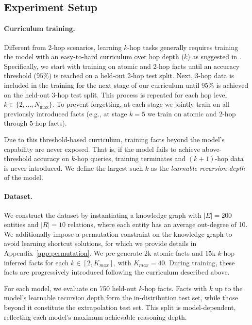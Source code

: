 \documentclass{article} %
\begin{document}
\subsection{Experiment Setup}
\label{sec:exp_setup}

\paragraph{Curriculum training.}
Different from 2-hop scenarios, learning $k$-hop tasks generally requires training the model with an easy-to-hard curriculum over hop depth ($k$) as suggested in \citet{yao-etal-2025-language-models}. 
Specifically, we start with training on atomic and 2-hop facts until an accuracy threshold ($95\%$) is reached on a held-out 2-hop test split. 
Next, 3-hop data is included in the training for the next stage of our curriculum until $95\%$ is achieved on the held-out 3-hop test split. 
This process is repeated for each hop level $k \in \{2, \dots, N_{\max}\}$. 
To prevent forgetting, at each stage we jointly train on all previously introduced facts (e.g., at stage $k=5$ we train on atomic and 2-hop through 5-hop facts).

Due to this threshold-based curriculum, training facts beyond the model’s capability are never exposed.
That is, if the model fails to achieve above-threshold accuracy on $k$-hop queries, training terminates and $(k+1)$-hop data is never introduced.
We define the largest such $k$ as the \textit{learnable recursion depth} of the model.

\paragraph{Dataset.} 
We construct the dataset by instantiating a knowledge graph with $|E|=200$ entities and $|R|=10$ relations, where each entity has an average out-degree of 10. 
We additionally impose a permutation constraint on the knowledge graph to avoid learning shortcut solutions, for which we provide details in Appendix~\ref{app:permutation}. 
We pre-generate 2k atomic facts and 15k $k$-hop inferred facts for each $k \in [2, K_{max}]$, with $K_{max}=40$. 
During training, these facts are progressively introduced following the curriculum described above.

For each model, we evaluate on 750 held-out $k$-hop facts.
Facts with $k$ up to the model’s learnable recursion depth form the in-distribution test set, while those beyond it constitute the extrapolation test set.
This split is model-dependent, reflecting each model’s maximum achievable reasoning depth.
\end{document}

